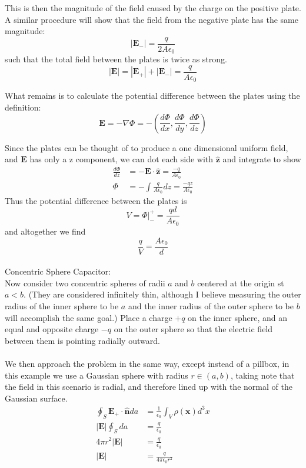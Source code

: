 \documentclass{article}
\begin{document}
This is then the magnitude of the field caused by the charge on the positive plate. A similar procedure will show that the field from the negative plate has the same magnitude: \[ \left|\mathbf{E}_{-}\right| = \frac{q}{2A\epsilon_{0}} \] such that the total field between the plates is twice as strong.
\[ \left|\mathbf{E}\right| = \left|\mathbf{E}_{+}\right| + \left|\mathbf{E}_{-}\right| = \frac{q}{A\epsilon_{0}} \]

What remains is to calculate the potential difference between the plates using the definition:
\[ \mathbf{E} = -\nabla\Phi = -\left( \frac{d\Phi}{dx}, \frac{d\Phi}{dy}, \frac{d\Phi}{dz} \right) \]

Since the plates can be thought of to produce a one dimensional uniform field, and $\mathbf{E}$ has only a z component, we can dot each side with $\mathbf{\hat{z}}$ and integrate to show
\begin{align*}
\frac{d\Phi}{dz} &= -\mathbf{E}\cdot\mathbf{\hat{z}} = \frac{-q}{A\epsilon_{0}}\\
\Phi &= -\int\frac{q}{A\epsilon_{0}}dz = \frac{-qz}{A\epsilon_{0}}
\end{align*}
Thus the potential difference between the plates is 
\[ V = \Phi\rvert_{-}^{+} = \frac{qd}{A\epsilon_{0}} \]
and altogether we find
\[ \frac{q}{V} = \boxed{\frac{A\epsilon_{0}}{d}}\]
\\
Concentric Sphere Capacitor:\\
Now consider two concentric spheres of radii $a$ and $b$ centered at the origin st $a<b$. (They are considered infinitely thin, although I believe measuring the outer radius of the inner sphere to be $a$ and the inner radius of the outer sphere to be $b$ will accomplish the same goal.) Place a charge $+q$ on the inner sphere, and an equal and opposite charge $-q$ on the outer sphere so that the electric field between them is pointing radially outward.\\
\\
We then approach the problem in the same way, except instead of a pillbox, in this example we use a Gaussian sphere with radius $r\in(a,b)$, taking note that the field in this scenario is radial, and therefore lined up with the normal of the Gaussian surface.\\
\begin{align*}
\oint_{S} \mathbf{E}_{+}\cdot \mathbf{\hat{n}} da &= \frac{1}{\epsilon_{0}} \int_{V} \rho(\mathbf{x}) d^{3}x\\
\left|\mathbf{E}\right|\oint_{S}da &= \frac{q}{\epsilon_{0}}\\
4\pi r^{2}\left|\mathbf{E}\right| &= \frac{q}{\epsilon_{0}}\\
\left|\mathbf{E}\right| &= \frac{q}{4\pi\epsilon_{0}r^{2}}
\end{align*}
\end{document}
